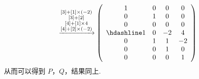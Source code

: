 \documentclass[UTF8,12pt,a4paper,fontset=fandol]{ctexart}
\begin{document}
\begin{solve}
\begin{enumerate}
\begin{gather*}
                  \xrightarrow{\substack{[3] + [1] \times (-2) \\ [3] + [2] \\ [4] + [1] \times 4 \\ [4] + [2] \times (-2)}}
                  \left(\begin{array}{cccc}
                      1 & 0 & 0  & 0  \\
                      0 & 1 & 0  & 0  \\
                      0 & 0 & 0  & 0  \\ \hdashline
                      1 & 0 & -2 & 4  \\
                      0 & 1 & 1  & -2 \\
                      0 & 0 & 1  & 0  \\
                      0 & 0 & 0  & 1
                  \end{array}\right)
              \end{gather*}
              从而可以得到 $P$，$Q$，结果同上.
    \end{enumerate}
\end{solve}
\end{document}
